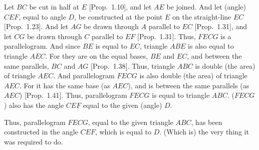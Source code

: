 \begin{Parallel}{}{}
{Let $BC$ be cut in half at $E$ [Prop.~1.10], and let $AE$ be joined. And let (angle) $CEF$, equal to angle $D$,  be constructed
at the point $E$ on the straight-line $EC$ [Prop.~1.23]. And let $AG$ be drawn through $A$
parallel to $EC$ [Prop.~1.31], and let $CG$ be drawn through $C$ parallel
to $EF$ [Prop.~1.31]. Thus, $FECG$ is a parallelogram. And since $BE$ is
equal to $EC$, triangle $ABE$ is also equal to triangle $AEC$. For they are
on the equal bases, $BE$ and $EC$, and between the same parallels, $BC$ and $AG$ [Prop.~1.38]. Thus, triangle $ABC$ is double (the area) of triangle $AEC$. And
parallelogram $FECG$ is also double (the area) of triangle $AEC$. For it has the same base (as $AEC$), and is between the same parallels  (as $AEC$) [Prop.~1.41].
Thus, parallelogram $FECG$ is equal to triangle $ABC$.  ($FECG$) also has
the angle $CEF$ equal to the given (angle) $D$.

\epsfysize=1.9in
\centerline{}

Thus, parallelogram $FECG$,  equal to the given
triangle $ABC$, has been constructed in the angle $CEF$, which is equal to $D$. (Which is) the
very thing it was required to do.}
\end{Parallel}

